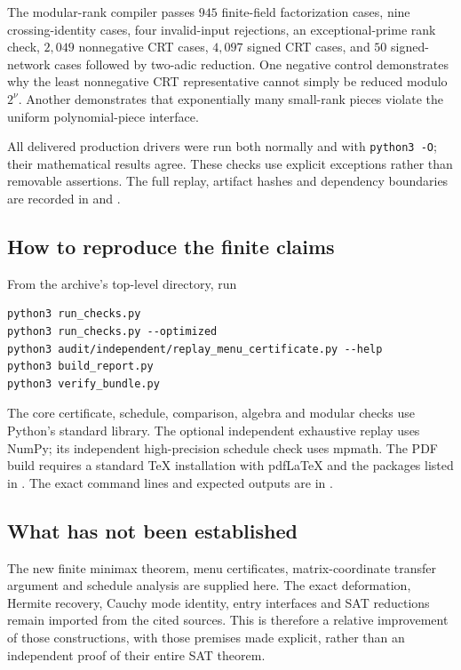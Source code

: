 The modular-rank compiler passes $945$ finite-field factorization cases,
nine crossing-identity cases, four invalid-input rejections, an
exceptional-prime rank check, $2{,}049$ nonnegative CRT cases,
$4{,}097$ signed CRT cases, and $50$ signed-network cases followed by
two-adic reduction. One negative control demonstrates why the least
nonnegative CRT representative cannot simply be reduced modulo $2^\nu$.
Another demonstrates that exponentially many small-rank pieces violate
the uniform polynomial-piece interface.

All delivered production drivers were run both normally and with
\texttt{python3 -O}; their mathematical results agree. These checks use
explicit exceptions rather than removable assertions. The full replay,
artifact hashes and dependency boundaries are recorded in
 and .

\subsection{How to reproduce the finite claims}

From the archive's top-level directory, run
\begin{lstlisting}
python3 run_checks.py
python3 run_checks.py --optimized
python3 audit/independent/replay_menu_certificate.py --help
python3 build_report.py
python3 verify_bundle.py
\end{lstlisting}
The core certificate, schedule, comparison, algebra and modular checks use
Python's standard library. The optional independent exhaustive replay
uses NumPy; its independent high-precision schedule check uses mpmath.
The PDF build requires a standard TeX installation with pdfLaTeX and the
packages listed in . The exact command lines and expected
outputs are in .

\subsection{What has not been established}

The new finite minimax theorem, menu certificates, matrix-coordinate
transfer argument and schedule analysis are supplied here. The exact
deformation, Hermite recovery, Cauchy mode identity, entry interfaces and
SAT reductions remain imported from the cited sources. This is therefore
a relative improvement of those constructions, with those premises made
explicit, rather than an independent proof of their entire SAT theorem.

